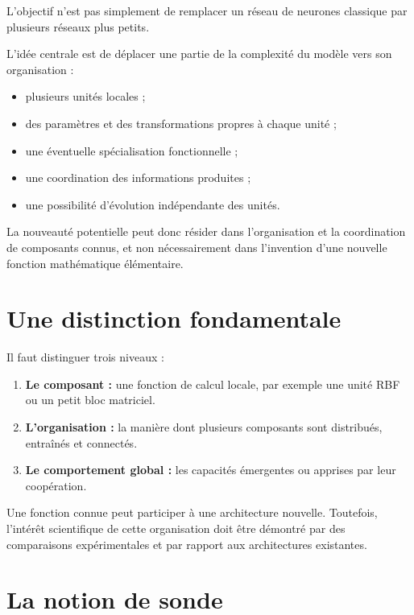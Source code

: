 \documentclass[11pt,a4paper]{report}
\begin{document}
L'objectif n'est pas simplement de remplacer un réseau
de neurones classique par plusieurs réseaux plus petits.

L'idée centrale est de déplacer une partie de la complexité
du modèle vers son organisation :

\begin{itemize}
  \item plusieurs unités locales ;
  \item des paramètres et des transformations propres
  à chaque unité ;
  \item une éventuelle spécialisation fonctionnelle ;
  \item une coordination des informations produites ;
  \item une possibilité d'évolution indépendante des unités.
\end{itemize}

La nouveauté potentielle peut donc résider dans l'organisation
et la coordination de composants connus, et non nécessairement
dans l'invention d'une nouvelle fonction mathématique élémentaire.

\section{Une distinction fondamentale}

Il faut distinguer trois niveaux :

\begin{enumerate}
  \item \textbf{Le composant :} une fonction de calcul locale,
  par exemple une unité RBF ou un petit bloc matriciel.

  \item \textbf{L'organisation :} la manière dont plusieurs
  composants sont distribués, entraînés et connectés.

  \item \textbf{Le comportement global :} les capacités
  émergentes ou apprises par leur coopération.
\end{enumerate}

Une fonction connue peut participer à une architecture
nouvelle. Toutefois, l'intérêt scientifique de cette
organisation doit être démontré par des comparaisons
expérimentales et par rapport aux architectures existantes.

\section{La notion de sonde}
\end{document}
